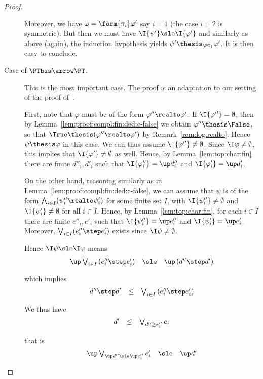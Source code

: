 \begin{proof}
\begin{description}
Moreover, we have $\varphi = \form{\pi_i}\varphi'$
say $i = 1$ (the case $i =2$ is symmetric).
But then we must have $\I{\psi'} \sle \I{\varphi'}$
and similarly as above (again), the induction hypothesis
yields $\psi' \thesis_{\PT_1} \varphi'$.
It is then easy to conclude.

\item[Case of $\PTbis \arrow \PT$.]
This is the most important case.
The proof is an adaptation to our setting
of the proof of~\cite[Proposition 10.5.2]{ac98book}.

First, note that $\varphi$ must be of the form $\varphi'' \realto \varphi'$.
If $\I{\varphi''} = \emptyset$,
then by Lemma~\ref{lem:proof:compl:fin:ded:c-false}
we obtain $\varphi'' \thesis \False$,
so that $\True \thesis (\varphi'' \realto \varphi')$
by Remark~\ref{rem:log:realto}.
Hence $\psi \thesis \varphi$ in this case.
We can thus assume $\I{\varphi''} \neq \emptyset$.
Since $\I\varphi \neq \emptyset$,
this implies that $\I{\varphi'} \neq \emptyset$ as well.
Hence, by Lemma~\ref{lem:top:char:fin}
there are finite $d''_i,d'_i$
such that $\I{\varphi''_i} = \up d''_i$
and $\I{\varphi'_i} = \up d'_i$.

On the other hand,
reasoning similarly as in Lemma~\ref{lem:proof:compl:fin:ded:c-false},
we can assume that $\psi$ is of the form
$\bigwedge_{i \in I} (\psi''_i \realto \psi'_i)$
for some finite set $I$, with $\I{\psi''_i} \neq \emptyset$
and $\I{\psi'_i} \neq \emptyset$ for all $i \in I$.
Hence, by Lemma~\ref{lem:top:char:fin},
for each $i \in I$ there are finite $e''_i,e'_i$
such that $\I{\psi''_i} = \up e''_i$
and $\I{\psi'_i} = \up e'_i$.
%
Moreover, $\bigvee_{i \in I}(e''_i \step e'_i)$
exists since $\I\psi \neq \emptyset$.

Hence $\I\psi \sle \I\varphi$ means
\[
\begin{array}{l l l}
  \up \bigvee_{i \in I} \left(e''_i \step e'_i \right)
& \sle
& \up \left( d'' \step d' \right)
\end{array}
\]

\noindent
which implies
\[
\begin{array}{l l l}
  d'' \step d'
& \leq
& \bigvee_{i \in I} \left(e''_i \step e'_i \right)
\end{array}
\]

\noindent
We thus have
\[
\begin{array}{l l l}
  d'
& \leq
& \bigvee_{d'' \geq e''_i} e_i
\end{array}
\]

\noindent
that is
\[
\begin{array}{l l l}
  \up \bigvee_{\up d'' \sle \up e''_i} e'_i
& \sle
& \up d'
\end{array}
\]


\end{description}
\end{proof}
